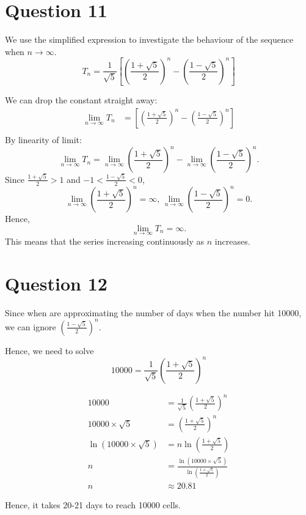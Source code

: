 \documentclass[12pt,a4paper]{article}
\begin{document}
\section*{Question 11}
We use the simplified expression to investigate the behaviour of the sequence when $n\to\infty$.
\[
T_n = \frac{1}{\sqrt{5}}\left[\left(\frac{1 + \sqrt{5}}{2}\right)^n - \left(\frac{1 - \sqrt{5}}{2}\right)^n\right]
\]

We can drop the constant straight away:
\[
\begin{aligned}
\lim _{n\rightarrow \infty } T_n & =\left[\left(\frac{1 + \sqrt{5}}{2}\right)^n - \left(\frac{1 - \sqrt{5}}{2}\right)^n\right]\\
\end{aligned}
\]
By linearity of limit:
\[
\lim _{n\rightarrow \infty } T_n = 
\lim _{n\rightarrow \infty } \left(\frac{1 + \sqrt{5}}{2}\right)^n
-\lim _{n\rightarrow \infty }\left(\frac{1 - \sqrt{5}}{2}\right)^n.
\]
Since $\frac{1 + \sqrt{5}}{2} > 1$ and $-1<\frac{1 - \sqrt{5}}{2} < 0$,
\[
\lim _{n\rightarrow \infty } \left(\frac{1 + \sqrt{5}}{2}\right)^n = \infty,\,
\lim _{n\rightarrow \infty }\left(\frac{1 - \sqrt{5}}{2}\right)^n=0.
\]
Hence,
\[
\lim _{n\rightarrow \infty } T_n = \infty.
\]
This means that the series increasing continuously as $n$ increases.

\section*{Question 12}
Since when are approximating the number of days when the number hit 10000, we can ignore $\left(\frac{1 - \sqrt{5}}{2}\right)^n$.

Hence, we need to solve
\[
10000 = \frac{1}{\sqrt{5}}\left(\frac{1 + \sqrt{5}}{2}\right)^n
\]

\begin{align*}
10000 &= \frac{1}{\sqrt{5}}\left(\frac{1 + \sqrt{5}}{2}\right)^n \\
10000 \times \sqrt{5} &= \left(\frac{1 + \sqrt{5}}{2}\right)^n \\
\ln\left(10000 \times \sqrt{5}\right) &= n \ln\left(\frac{1 + \sqrt{5}}{2}\right) \\
n &= \frac{\ln\left(10000 \times \sqrt{5}\right)}{\ln\left(\frac{1 + \sqrt{5}}{2}\right)} \\
n &\approx 20.81
\end{align*}

Hence, it takes 20-21 days to reach 10000 cells.
\end{document}
